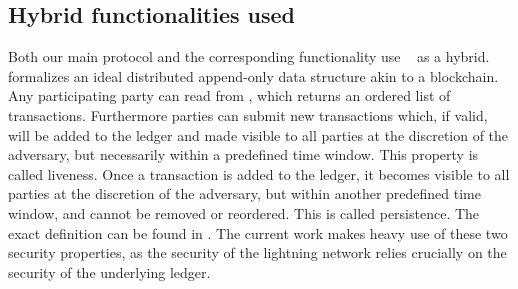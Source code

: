 
  \subsection{Hybrid functionalities used}
    Both our main protocol and the corresponding functionality use
    \ledger~\cite{BMTZ17,genesis} as a hybrid. \ledger{} formalizes an ideal
    distributed append-only data structure akin to a blockchain. Any
    participating party can read from \ledger, which returns an ordered list
    of transactions. Furthermore parties can submit new transactions which, if
    valid, will be added to the ledger and made visible to all parties
    at the discretion of the adversary, but necessarily within a predefined time
    window. This property is called liveness. Once a transaction is added to the
    ledger, it becomes visible to all parties at the discretion of the
    adversary, but within another predefined time window, and cannot be removed
    or reordered. This is called persistence. The exact definition can be found
    in . The current work makes
    heavy use of these two security properties, as the security of the lightning
    network relies crucially on the security of the underlying ledger.

